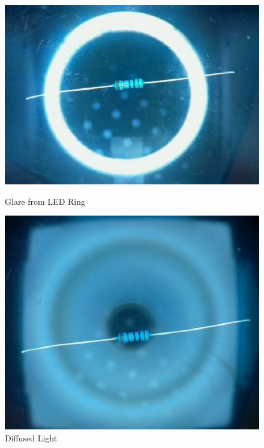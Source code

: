\begin{figure}
    \begin{minipage}[t]{0.49\textwidth}
        \centering
        \includegraphics[width=\textwidth]{imgs/design/ringlight.jpg}
        \caption{Glare from LED Ring}
        \label{fig:glare}
    \end{minipage}
    \hfill
    \begin{minipage}[t]{0.49\textwidth}
        \centering
        \includegraphics[width=\textwidth]{imgs/design/diffusedlight.jpg}
        \caption{Diffused Light}
        \label{fig:diffusedlight}
    \end{minipage}
\end{figure}

